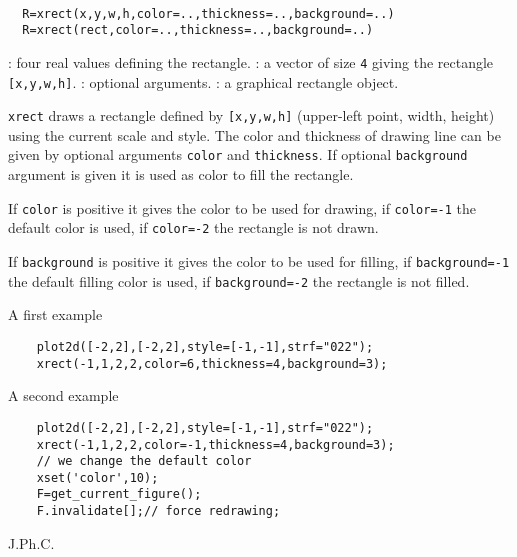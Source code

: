 
\begin{mandesc}
  \\ %
\end{mandesc}
\begin{calling_sequence}
\begin{verbatim}
  R=xrect(x,y,w,h,color=..,thickness=..,background=..)
  R=xrect(rect,color=..,thickness=..,background=..)
\end{verbatim}
\end{calling_sequence}

\begin{parameters}
  \begin{varlist}
    : four real values defining the rectangle.
    : a vector of size \verb!4! giving the rectangle
    \verb![x,y,w,h]!.
    : optional arguments.
    : a graphical rectangle object.
  \end{varlist}
\end{parameters}

\begin{mandescription}
  \verb!xrect! draws a rectangle defined by \verb![x,y,w,h]!
  (upper-left point, width, height) using the current scale and style.
  The color and thickness of drawing line can be given by optional arguments
  \verb!color! and \verb!thickness!. If optional \verb!background!
  argument is given it is used as color to fill the rectangle.

  If \verb!color! is positive it gives the color to be used for drawing,
  if \verb!color=-1! the default color is used, if  \verb!color=-2! the
  rectangle is not drawn.

  If \verb!background! is positive it gives the color to be used for filling,
  if \verb!background=-1! the default filling color is used,
  if  \verb!background=-2! the rectangle is not filled.

\end{mandescription}

\begin{examples}

A first example

  \begin{Verbatim}
    plot2d([-2,2],[-2,2],style=[-1,-1],strf="022");
    xrect(-1,1,2,2,color=6,thickness=4,background=3);
  \end{Verbatim}

A second example

  \begin{Verbatim}
    plot2d([-2,2],[-2,2],style=[-1,-1],strf="022");
    xrect(-1,1,2,2,color=-1,thickness=4,background=3);
    // we change the default color
    xset('color',10);
    F=get_current_figure();
    F.invalidate[];// force redrawing;
  \end{Verbatim}
\end{examples}

\begin{manseealso}
   
\end{manseealso}

\begin{authors}
  J.Ph.C.
\end{authors}
